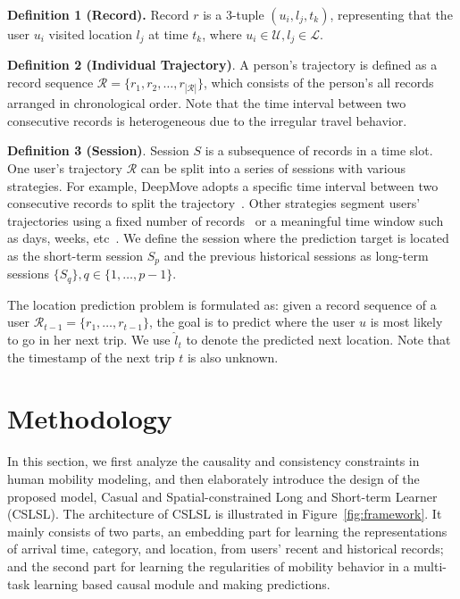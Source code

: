 \documentclass[sigconf]{acmart}
\begin{document}
   \textbf{Definition 1 (Record).}  Record $r$ is a 3-tuple $(u_i, l_j, t_k)$, representing that the user $u_i$ visited location $l_j$ at time $t_k$, where $u_i\in\mathcal{U}, l_j\in\mathcal{L}$.
   
   \textbf{Definition 2 (Individual Trajectory)}. A person's trajectory is defined as a record sequence $\mathcal{R}=\{r_1, r_2, \dots, r_{|\mathcal{R}|}\}$, which consists of the person's all records arranged in chronological order. Note that the time interval between two consecutive records is heterogeneous due to the irregular travel behavior.   
   
   \textbf{Definition 3 (Session)}. Session $S$ is a subsequence of records in a time slot. One user's trajectory $\mathcal{R}$ can be split into a series of sessions with various strategies. 
   For example, DeepMove adopts a specific time interval between two consecutive records to split the trajectory~\cite{feng2018deepmove}. 
   Other strategies segment users' trajectories using a fixed number of records~\cite{yang2020location,luo2021stan} or a meaningful time window such as days, weeks, etc~\cite{sun2020go}.
   We define the session where the prediction target is located as the short-term session $S_p$ and the previous historical sessions as long-term sessions $\{S_q\},q\in\{1,\dots,p-1\}$. 
   
   The location prediction problem is formulated as: given a record sequence of a user $\mathcal{R}_{t-1}=\{r_1, \dots, r_{t-1}\}$, the goal is to predict where the user $u$ is most likely to go in her next trip.  
   We use $\hat{l}_t$ to denote the predicted next location. Note that the timestamp of the next trip $t$ is also unknown.
   
\section{Methodology}

    In this section, we first analyze the causality and consistency constraints in human mobility modeling, and then elaborately introduce the design of the proposed model, Casual and Spatial-constrained Long and Short-term Learner (CSLSL). The architecture of CSLSL is illustrated in Figure~\ref{fig:framework}. It mainly consists of two parts, an embedding part for learning the representations of arrival time, category, and location, from users' recent and historical records; and the second part for learning the regularities of mobility behavior in a multi-task learning based causal module and making predictions.
    
\end{document}
